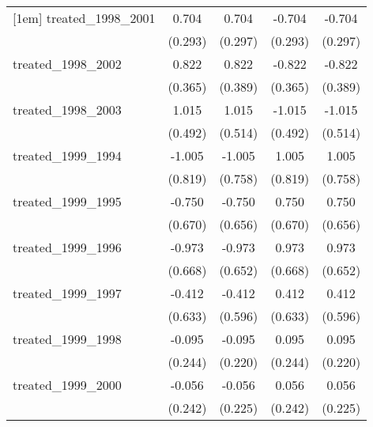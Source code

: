 {\begin{tabular}{l*{4}{c}}
[1em]
treated\_1998\_2001&       0.704\sym{*}  &       0.704\sym{*}  &      -0.704\sym{*}  &      -0.704\sym{*}  \\
            &     (0.293)         &     (0.297)         &     (0.293)         &     (0.297)         \\
[1em]
treated\_1998\_2002&       0.822\sym{*}  &       0.822\sym{*}  &      -0.822\sym{*}  &      -0.822\sym{*}  \\
            &     (0.365)         &     (0.389)         &     (0.365)         &     (0.389)         \\
[1em]
treated\_1998\_2003&       1.015\sym{*}  &       1.015\sym{*}  &      -1.015\sym{*}  &      -1.015\sym{*}  \\
            &     (0.492)         &     (0.514)         &     (0.492)         &     (0.514)         \\
[1em]
treated\_1999\_1994&      -1.005         &      -1.005         &       1.005         &       1.005         \\
            &     (0.819)         &     (0.758)         &     (0.819)         &     (0.758)         \\
[1em]
treated\_1999\_1995&      -0.750         &      -0.750         &       0.750         &       0.750         \\
            &     (0.670)         &     (0.656)         &     (0.670)         &     (0.656)         \\
[1em]
treated\_1999\_1996&      -0.973         &      -0.973         &       0.973         &       0.973         \\
            &     (0.668)         &     (0.652)         &     (0.668)         &     (0.652)         \\
[1em]
treated\_1999\_1997&      -0.412         &      -0.412         &       0.412         &       0.412         \\
            &     (0.633)         &     (0.596)         &     (0.633)         &     (0.596)         \\
[1em]
treated\_1999\_1998&      -0.095         &      -0.095         &       0.095         &       0.095         \\
            &     (0.244)         &     (0.220)         &     (0.244)         &     (0.220)         \\
[1em]
treated\_1999\_2000&      -0.056         &      -0.056         &       0.056         &       0.056         \\
            &     (0.242)         &     (0.225)         &     (0.242)         &     (0.225)         \\

\end{tabular}}
